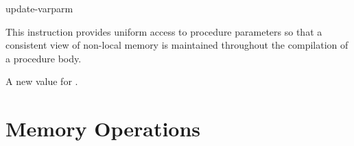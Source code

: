 \begin{instruction}{update-varparm}

  \begin{notes}
    This instruction provides uniform access to \byref procedure
    parameters so that a consistent view of non-local memory is
    maintained throughout the compilation of a procedure body.
  \end{notes}

  \begin{results}
  \item A new value for .
  \end{results}

  \begin{operands}
  \item {}
  \item {}
  \item {}
  \item {}
  \end{operands}

  \begin{seealso}
  \end{seealso}
\end{instruction}


\section{Memory Operations}\label{class:memory-operations}

